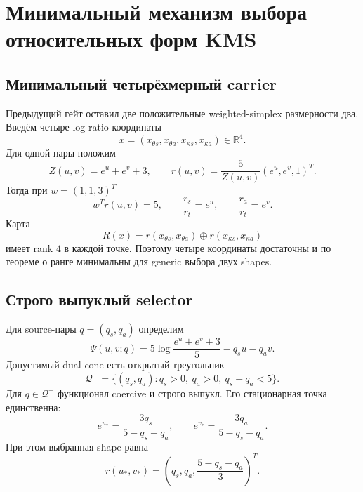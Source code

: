 \chapter{Минимальный механизм выбора относительных форм KMS}
\label{ch:v9-endpoint-kms-relative-shape-selector}

\section{Минимальный четырёхмерный carrier}

Предыдущий гейт оставил две положительные weighted-simplex размерности два.
Введём четыре log-ratio координаты
\begin{equation}
 x=(x_{\theta s},x_{\theta a},x_{\kappa s},x_{\kappa a})
 \in\mathbb R^4.
 \label{eq:v9-kms-shape-selector-carrier}
\end{equation}
Для одной пары положим
\begin{equation}
 Z(u,v)=e^u+e^v+3,
 \qquad
 r(u,v)=\frac{5}{Z(u,v)}(e^u,e^v,1)^T.
 \label{eq:v9-kms-shape-selector-chart}
\end{equation}
Тогда при $w=(1,1,3)^T$
\begin{equation}
 w^Tr(u,v)=5,
 \qquad
 \frac{r_s}{r_t}=e^u,
 \qquad
 \frac{r_a}{r_t}=e^v.
 \label{eq:v9-kms-shape-selector-chart-properties}
\end{equation}
Карта
\begin{equation}
 R(x)=r(x_{\theta s},x_{\theta a})
 \oplus r(x_{\kappa s},x_{\kappa a})
 \label{eq:v9-kms-shape-selector-full-chart}
\end{equation}
имеет rank $4$ в каждой точке. Поэтому четыре координаты достаточны и по
теореме о ранге минимальны для generic выбора двух shapes.

\section{Строго выпуклый selector}

Для source-пары $q=(q_s,q_a)$ определим
\begin{equation}
 \Psi(u,v;q)=5\log\frac{e^u+e^v+3}{5}-q_su-q_av.
 \label{eq:v9-kms-shape-selector-block}
\end{equation}
Допустимый dual cone есть открытый треугольник
\begin{equation}
 \mathcal Q^+=\{(q_s,q_a):q_s>0,\ q_a>0,\ q_s+q_a<5\}.
 \label{eq:v9-kms-shape-selector-source-cone}
\end{equation}
Для $q\in\mathcal Q^+$ функционал coercive и строго выпукл. Его
стационарная точка единственна:
\begin{equation}
 e^{u_*}=\frac{3q_s}{5-q_s-q_a},
 \qquad
 e^{v_*}=\frac{3q_a}{5-q_s-q_a}.
 \label{eq:v9-kms-shape-selector-minimum}
\end{equation}
При этом выбранная shape равна
\begin{equation}
 r(u_*,v_*)=
 \left(q_s,q_a,\frac{5-q_s-q_a}{3}\right)^T.
 \label{eq:v9-kms-shape-selector-selected-shape}
\end{equation}

